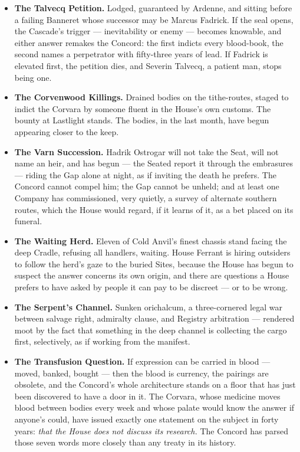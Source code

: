 \begin{itemize}
    \item \textbf{The Talvecq Petition.} Lodged, guaranteed by Ardenne, and sitting before a failing Banneret whose successor may be Marcus Fadrick. If the seal opens, the Cascade's trigger --- inevitability or enemy --- becomes knowable, and either answer remakes the Concord: the first indicts every blood-book, the second names a perpetrator with fifty-three years of lead. If Fadrick is elevated first, the petition dies, and Severin Talvecq, a patient man, stops being one.
    \item \textbf{The Corvenwood Killings.} Drained bodies on the tithe-routes, staged to indict the Corvara by someone fluent in the House's own customs. The bounty at Lastlight stands. The bodies, in the last month, have begun appearing closer to the keep.
    \item \textbf{The Varn Succession.} Hadrik Ostrogar will not take the Seat, will not name an heir, and has begun --- the Seated report it through the embrasures --- riding the Gap alone at night, as if inviting the death he prefers. The Concord cannot compel him; the Gap cannot be unheld; and at least one Company has commissioned, very quietly, a survey of alternate southern routes, which the House would regard, if it learns of it, as a bet placed on its funeral.
    \item \textbf{The Waiting Herd.} Eleven of Cold Anvil's finest chassis stand facing the deep Cradle, refusing all handlers, waiting. House Ferrant is hiring outsiders to follow the herd's gaze to the buried Sites, because the House has begun to suspect the answer concerns its own origin, and there are questions a House prefers to have asked by people it can pay to be discreet --- or to be wrong.
    \item \textbf{The Serpent's Channel.} Sunken orichalcum, a three-cornered legal war between salvage right, admiralty clause, and Registry arbitration --- rendered moot by the fact that something in the deep channel is collecting the cargo first, selectively, as if working from the manifest.
    \item \textbf{The Transfusion Question.} If expression can be carried in blood --- moved, banked, bought --- then the blood is currency, the pairings are obsolete, and the Concord's whole architecture stands on a floor that has just been discovered to have a door in it. The Corvara, whose medicine moves blood between bodies every week and whose palate would know the answer if anyone's could, have issued exactly one statement on the subject in forty years: \textit{that the House does not discuss its research.} The Concord has parsed those seven words more closely than any treaty in its history.
\end{itemize}

